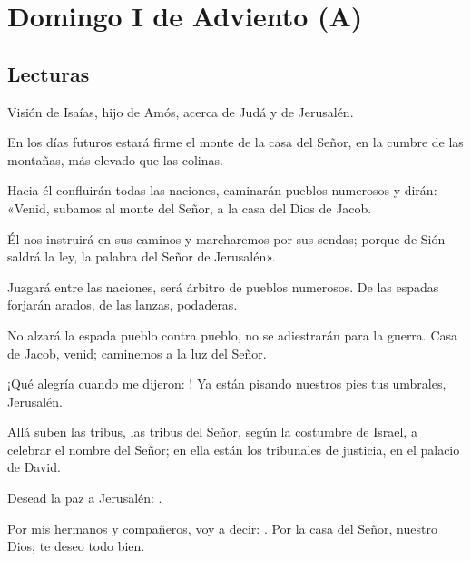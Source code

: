 \chapter{Domingo I de Adviento (A)}

\section{Lecturas}


 


\begin{readprose}
	Visión de Isaías, hijo de Amós, acerca de Judá y de Jerusalén.
	
	En los días futuros estará firme	
	el monte de la casa del Señor, 
	en la cumbre de las montañas, 	
	más elevado que las colinas. 	
	
	Hacia él confluirán todas las naciones, 	
	caminarán pueblos numerosos y dirán: 	
	«Venid, subamos al monte del Señor, 	
	a la casa del Dios de Jacob. 
	
	Él nos instruirá en sus caminos 
	y marcharemos por sus sendas; 	
	porque de Sión saldrá la ley, 	
	la palabra del Señor de Jerusalén». 
	
	Juzgará entre las naciones, 	
	será árbitro de pueblos numerosos. 	
	De las espadas forjarán arados, 	
	de las lanzas, podaderas. 
	
	No alzará la espada pueblo contra pueblo, 	
	no se adiestrarán para la guerra. 	
	Casa de Jacob, venid; 	
	caminemos a la luz del Señor.
\end{readprose}



 


\begin{psbody}
	¡Qué alegría cuando me dijeron: 
	! 
	Ya están pisando nuestros pies 
	tus umbrales, Jerusalén. 
	
	Allá suben las tribus, 
	las tribus del Señor, 
	según la costumbre de Israel, 
	a celebrar el nombre del Señor; 
	en ella están los tribunales de justicia, 
	en el palacio de David.
	
	Desead la paz a Jerusalén: 
	.
	
	Por mis hermanos y compañeros, 
	voy a decir: . 
	Por la casa del Señor, 
	nuestro Dios, te deseo todo bien.
\end{psbody}

